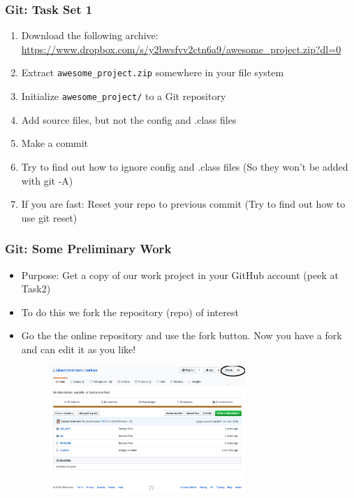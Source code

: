 \documentclass{beamer} %
\begin{document}
\begin{frame}[t, fragile]
\frametitle{Git: Task Set 1}

\begin{enumerate}
	\item Download the following archive:
    \url{https://www.dropbox.com/s/y2bwsfvv2ctn6a9/awesome_project.zip?dl=0}
    \item Extract \verb|awesome_project.zip| somewhere in your file system
    \item Initialize \verb|awesome_project/| to a Git repository
    \item Add source files, but not the config and .class files
    \item Make a commit
    \item Try to find out how to ignore config and .class files (So they won't be added 
    with git -A)
    \item If you are fast: Reset your repo to previous commit (Try to find out how to use git reset)
\end{enumerate}

\end{frame}

\begin{frame}[t, fragile]
\frametitle{Git: Some Preliminary Work}

\begin{itemize}
    \setlength\itemsep{1em}
	\item Purpose: Get a copy of our work project in your GitHub account (peek at Task2)
    \item To do this we fork the repository (repo) of interest
    \item Go the the online repository and use the fork button. Now you have a fork and can edit it as you like! \begin{figure}
    \begin{center}
    	\includegraphics[width=0.7\textwidth]{assets/fork.png}
    \end{center}
\end{figure}   
\end{itemize}
\end{frame}
\end{document}
